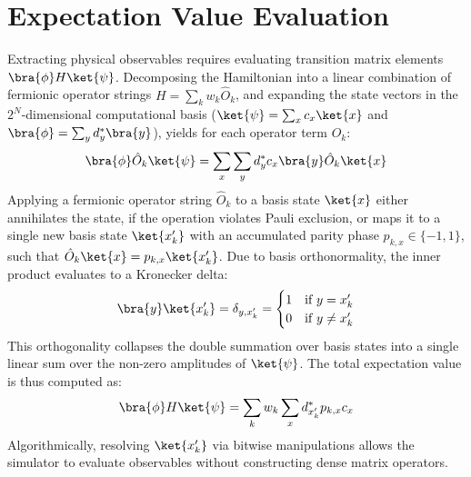 \section{Expectation Value Evaluation}\label{sec:expectation-value-evaluation}
Extracting physical observables requires evaluating transition matrix elements $\bra{\phi} H \ket{\psi}$. Decomposing the Hamiltonian into a linear combination of fermionic operator strings $H = \sum_k w_k \hat{O}_k$, and expanding the state vectors in the $2^N$-dimensional computational basis ($\ket{\psi} = \sum_x c_x \ket{x}$ and $\bra{\phi} = \sum_y d_y^* \bra{y}$), yields for each operator term $\hat{O}_k$:
\begin{equation}
	\bra{\phi} \hat{O}_k \ket{\psi} = \sum_{x} \sum_{y} d_y^* c_x \bra{y} \hat{O}_k \ket{x}
\end{equation}
Applying a fermionic operator string $\hat{O}_k$ to a basis state $\ket{x}$ either annihilates the state, if the operation violates Pauli exclusion, or maps it to a single new basis state $\ket{x'_k}$ with an accumulated parity phase $p_{k,x} \in \{-1, 1\}$, such that $\hat{O}_k \ket{x} = p_{k,x} \ket{x'_k}$. Due to basis orthonormality, the inner product evaluates to a Kronecker delta:
\begin{equation}
	\bra{y} \ket{x'_k} = \delta_{y, x'_k} = \begin{cases} 1 & \text{if } y = x'_k \\ 0 & \text{if } y \neq x'_k \end{cases}
\end{equation}
This orthogonality collapses the double summation over basis states into a single linear sum over the non-zero amplitudes of $\ket{\psi}$. The total expectation value is thus computed as:
\begin{equation}
	\bra{\phi} H \ket{\psi} = \sum_k w_k \sum_{x} d_{x'_k}^* p_{k,x} c_x\label{eq:expectation-value-decomposed}
\end{equation}
Algorithmically, resolving $\ket{x'_k}$ via bitwise manipulations allows the simulator to evaluate observables without constructing dense matrix operators.
\cite[chapter II.A, II.B]{kohda2022quantum}